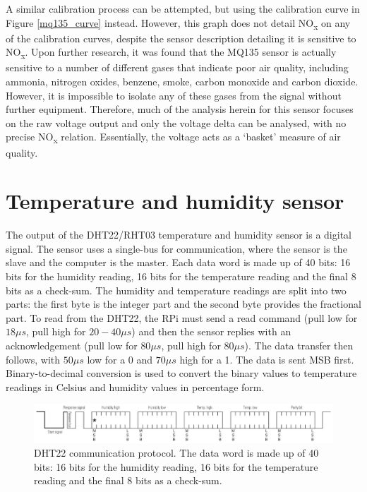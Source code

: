 \documentclass[11pt]{report}
\begin{document}
A similar calibration process can be attempted, but using the calibration curve in Figure \ref{mq135_curve} instead. However, this graph does not detail NO\textsubscript{x} on any of the calibration curves, despite the sensor description detailing it is sensitive to NO\textsubscript{x}. Upon further research, it was found that the MQ135 sensor is actually sensitive to a number of different gases that indicate poor air quality, including ammonia, nitrogen oxides, benzene, smoke, carbon monoxide and carbon dioxide. However, it is impossible to isolate any of these gases from the signal without further equipment. Therefore, much of the analysis herein for this sensor focuses on the raw voltage output and only the voltage delta can be analysed, with no precise NO\textsubscript{x} relation. Essentially, the voltage acts as a `basket' measure of air quality.

\section{Temperature and humidity sensor}

The output of the DHT22/RHT03 temperature and humidity sensor is a digital signal. The sensor uses a single-bus for communication, where the sensor is the slave and the computer is the master. Each data word is made up of 40 bits: 16 bits for the humidity reading, 16 bits for the temperature reading and the final 8 bits as a check-sum. The humidity and temperature readings are split into two parts: the first byte is the integer part and the second byte provides the fractional part. To read from the DHT22, the RPi must send a read command (pull low for $18\mu s$, pull high for $20-40\mu s$) and then the sensor replies with an acknowledgement (pull low for $80\mu s$, pull high for $80\mu s$). The data transfer then follows, with $50\mu s$ low for a 0 and $70\mu s$ high for a 1. The data is sent MSB first. Binary-to-decimal conversion is used to convert the binary values to temperature readings in Celsius and humidity values in percentage form.

\begin{figure}[!tb]
\centering
\includegraphics[width=1\textwidth]{images/dht22_data}
\caption[DHT22 communication protocol.]{DHT22 communication protocol. The data word is made up of 40 bits: 16 bits for the humidity reading, 16 bits for the temperature reading and the final 8 bits as a check-sum.}
\label{dht22_data}
\end{figure}
\end{document}
